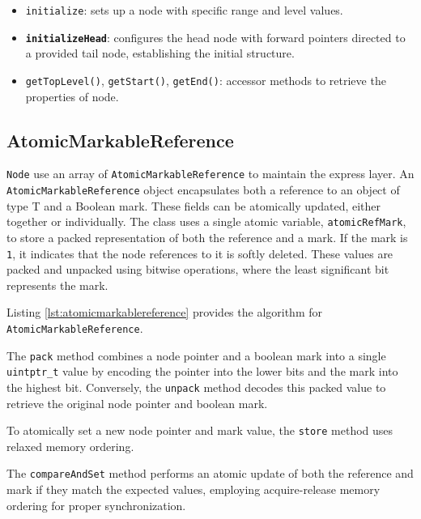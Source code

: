 \begin{itemize}
    \item \texttt{initialize}: sets up a node with specific range and level values.
    \item \textbf{\texttt{initializeHead}}: configures the head node with forward pointers directed to a provided tail node, establishing the initial structure.
    \item \texttt{getTopLevel()}, \texttt{getStart()}, \texttt{getEnd()}: accessor methods to retrieve the properties of node.
\end{itemize}

\begin{figure}[h]
    \centering
    
\end{figure}

\clearpage

\subsection{AtomicMarkableReference} \label{subsec:atomicmarkablereference}

\texttt{Node} use an array of \texttt{AtomicMarkableReference} to maintain the express layer. 
An \texttt{AtomicMarkableReference} object encapsulates both a reference to an object of type T and a Boolean mark. 
These fields can be atomically updated, either together or individually. 
The  class uses a single atomic variable, \texttt{atomicRefMark}, to store a packed representation of both the reference and a mark. 
If the mark is \texttt{1}, it indicates that the node references to it is softly deleted. 
These values are packed and unpacked using bitwise operations, where the least significant bit represents the mark.

Listing \ref{lst:atomicmarkablereference} provides the algorithm for \texttt{AtomicMarkableReference}.

The \texttt{pack} method combines a node pointer and a boolean mark into a single \texttt{uintptr\_t} value by encoding the pointer into the lower bits and the mark into the highest bit. Conversely, the \texttt{unpack} method decodes this packed value to retrieve the original node pointer and boolean mark.

To atomically set a new node pointer and mark value, the \texttt{store} method uses relaxed memory ordering.

The \texttt{compareAndSet} method performs an atomic update of both the reference and mark if they match the expected values, employing acquire-release memory ordering for proper synchronization.

